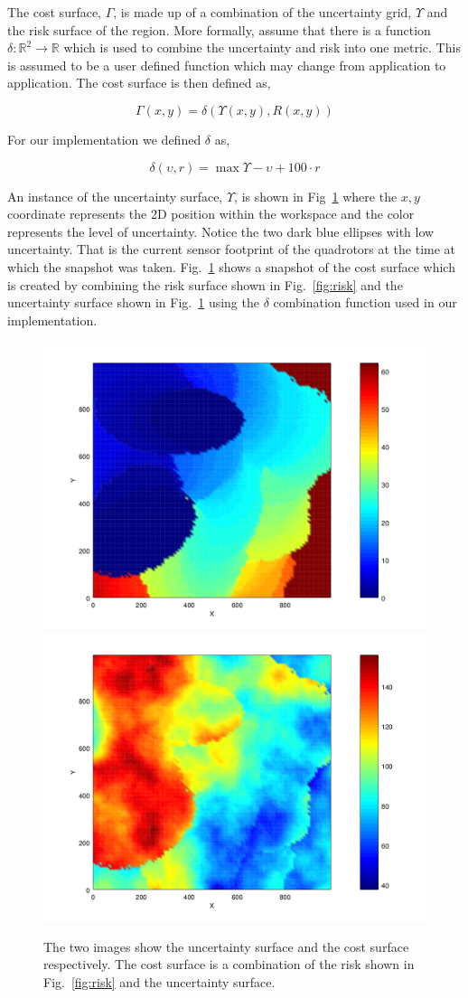 \documentclass{article}
\begin{document}
The cost surface, $\Gamma$, is made up of a combination of the uncertainty
grid, $\Upsilon$ and the risk surface of the region. More formally, assume that
there is a function $\delta : \mathbb{R}^2 \rightarrow \mathbb{R}$ which is
used to combine the uncertainty and risk into one metric. This is assumed to be
a user defined function which may change from application to application. The
cost surface is then defined as,

$$\Gamma(x, y) = \delta(\Upsilon(x, y), R(x, y))$$

For our implementation we defined $\delta$ as,

$$\delta(\upsilon, r) = \max{\Upsilon} - \upsilon + 100 \cdot r$$

An instance of the uncertainty surface, $\Upsilon$, is shown in
Fig~\ref{fig:cost} where the $x, y$ coordinate represents the 2D position within
the workspace and the color represents the level of uncertainty. Notice the two
dark blue ellipses with low uncertainty. That is the current sensor footprint
of the quadrotors at the time at which the snapshot was taken.
Fig.~\ref{fig:cost} shows a snapshot of the cost surface which is created by
combining the risk surface shown in Fig.~\ref{fig:risk} and the uncertainty
surface shown in Fig.~\ref{fig:cost} using the $\delta$ combination function
used in our implementation.

\begin{figure}[h!]

    \includegraphics[width=0.49\columnwidth]{tasefigs/uncertainty.png}
    \includegraphics[width=0.49\columnwidth]{tasefigs/costsurf.png}

    \caption{The two images show the uncertainty surface and the cost surface
    respectively. The cost surface is a combination of the risk shown in
    Fig.~\ref{fig:risk} and the uncertainty surface.}

    \label{fig:cost}

\end{figure}
\end{document}
